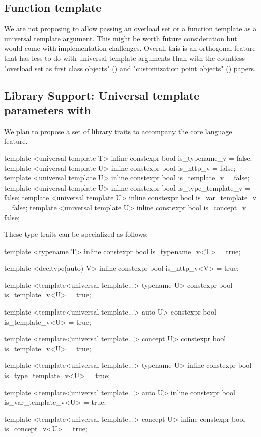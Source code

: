 \documentclass{wg21}
\begin{document}
\subsection{Function template}


We are not proposing to allow passing an overload set or a function template as a universal template argument.
This might be worth future consideration but would come with implementation challenges.
Overall this is an orthogonal feature that has less to do with universal template arguments than with the countless
"overload set as first class objects" () and "customization point objects" () papers.


\subsection{Library Support: Universal template parameters with }

We plan to propose a set of library traits to accompany the core language feature.


\begin{colorblock}
template <universal template T>
inline constexpr bool is_typename_v = false;
template <universal template U>
inline constexpr bool is_nttp_v = false;
template <universal template U>
inline constexpr bool is_template_v = false;
template <universal template U>
inline constexpr bool is_type_template_v = false;
template <universal template U>
inline constexpr bool is_var_template_v = false;
template <universal template U>
inline constexpr bool is_concept_v = false;
\end{colorblock}

These type traits can be specialized as follows:

\begin{colorblock}
template <typename T>
inline constexpr bool is_typename_v<T> = true;

template <decltype(auto) V>
inline constexpr bool is_nttp_v<V> = true;

template <template<universal template...> typename U>
constexpr bool is_template_v<U> = true;

template <template<universal template...> auto U>
constexpr bool is_template_v<U> = true;

template <template<universal template...> concept U>
constexpr bool is_template_v<U> = true;

template <template<universal template...> typename U>
inline constexpr bool is_type_template_v<U> = true;

template <template<universal template...> auto U>
inline constexpr bool is_var_template_v<U> = true;

template <template<universal template...> concept U>
inline constexpr bool is_concept_v<U> = true;
\end{colorblock}
\end{document}
